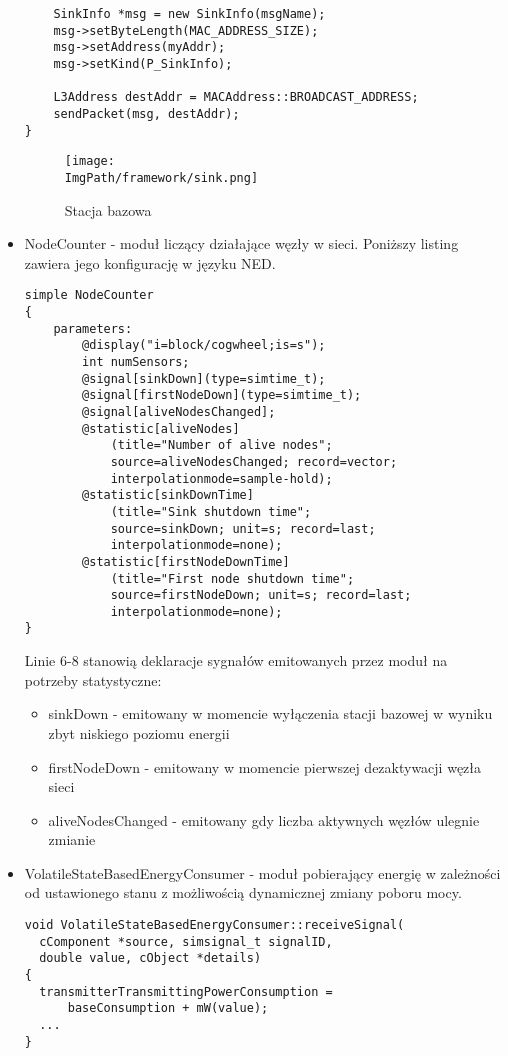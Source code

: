 \begin{itemize}
\begin{verbatim}
    SinkInfo *msg = new SinkInfo(msgName);
    msg->setByteLength(MAC_ADDRESS_SIZE);
    msg->setAddress(myAddr);
    msg->setKind(P_SinkInfo);

    L3Address destAddr = MACAddress::BROADCAST_ADDRESS;
    sendPacket(msg, destAddr);
}
\end{verbatim}
	\begin{figure}[!htbp]
	\begin{center}
		\centering
		\texttt{[image: \\ImgPath/framework/sink.png]} 
	\end{center}
	\caption{Stacja bazowa}
	\label{abstractNode}
\end{figure}
\FloatBarrier
	\item NodeCounter - moduł liczący działające węzły w sieci. Poniższy listing zawiera jego konfigurację w języku NED.
	\begin{verbatim}
simple NodeCounter
{
    parameters:
        @display("i=block/cogwheel;is=s");
        int numSensors;
        @signal[sinkDown](type=simtime_t);
        @signal[firstNodeDown](type=simtime_t);
        @signal[aliveNodesChanged];
        @statistic[aliveNodes]
            (title="Number of alive nodes";
            source=aliveNodesChanged; record=vector;
            interpolationmode=sample-hold);
        @statistic[sinkDownTime]
            (title="Sink shutdown time";
            source=sinkDown; unit=s; record=last;
            interpolationmode=none);
        @statistic[firstNodeDownTime]
            (title="First node shutdown time";
            source=firstNodeDown; unit=s; record=last;
            interpolationmode=none);
}
	\end{verbatim}
Linie 6-8 stanowią deklaracje sygnałów emitowanych przez moduł na potrzeby statystyczne:
\begin{itemize}
\item sinkDown - emitowany w momencie wyłączenia stacji bazowej w wyniku zbyt niskiego poziomu energii
\item firstNodeDown - emitowany w momencie pierwszej dezaktywacji węzła sieci
\item aliveNodesChanged - emitowany gdy liczba aktywnych węzłów ulegnie zmianie
\end{itemize}
	\item VolatileStateBasedEnergyConsumer - moduł pobierający energię w zależności od ustawionego stanu z możliwością dynamicznej zmiany poboru mocy.
	\begin{verbatim}
void VolatileStateBasedEnergyConsumer::receiveSignal(
  cComponent *source, simsignal_t signalID,
  double value, cObject *details)
{
  transmitterTransmittingPowerConsumption =
      baseConsumption + mW(value);
  ...
}
	\end{verbatim}
\end{itemize}
